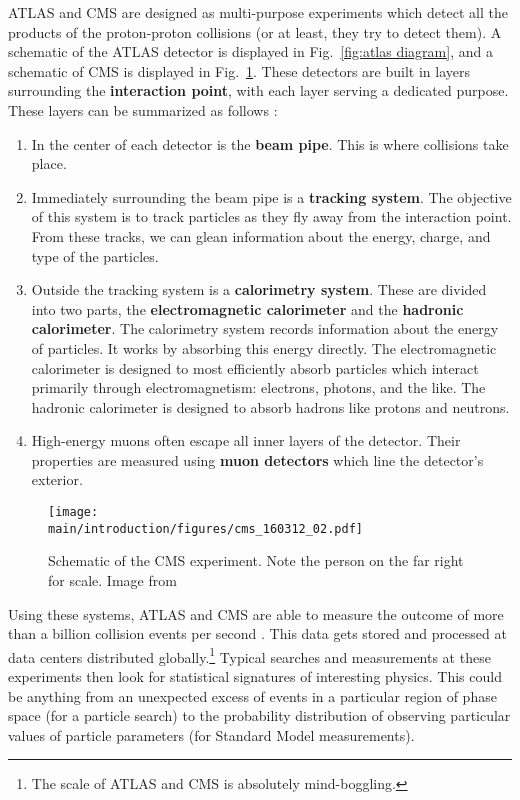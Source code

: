 \documentclass[12pt,twoside,class=../reedthesis, crop=false]{standalone}
\begin{document}
	ATLAS and CMS are designed as multi-purpose experiments which detect all the products of the proton-proton collisions (or at least, they try to detect them). A schematic of the ATLAS detector is displayed in Fig.~\ref{fig:atlas diagram}, and a schematic of CMS is displayed in Fig.~\ref{fig:cms diagram}. These detectors are built in layers surrounding the \textbf{interaction point}, with each layer serving a dedicated purpose. These layers can be summarized as follows \cite{larkoski_elementary_2019-1}:
	\begin{enumerate}
		\item In the center of each detector is the \textbf{beam pipe}. This is where collisions take place.

		\item Immediately surrounding the beam pipe is a \textbf{tracking system}. The objective of this system is to track particles as they fly away from the interaction point. From these tracks, we can glean information about the energy, charge, and type of the particles.

		\item Outside the tracking system is a \textbf{calorimetry system}. These are divided into two parts, the \textbf{electromagnetic calorimeter} and the \textbf{hadronic calorimeter}. The calorimetry system records information about the energy of particles. It works by absorbing this energy directly. The electromagnetic calorimeter is designed to most efficiently absorb particles which interact primarily through electromagnetism: electrons, photons, and the like. The hadronic calorimeter is designed to absorb hadrons like protons and neutrons.

		\item High-energy muons often escape all inner layers of the detector. Their properties are measured using \textbf{muon detectors} which line the detector's exterior.
	\end{enumerate}

	\begin{figure}
	\begin{center}
		\texttt{[image: \\main/introduction/figures/cms\_160312\_02.pdf]}
		\caption{\label{fig:cms diagram}Schematic of the CMS experiment. Note the person on the far right for scale. Image from \cite{sakuma_detector_2014}}
	\end{center}
	\end{figure}

	Using these systems, ATLAS and CMS are able to measure the outcome of more than a billion collision events per second \cite{atlas_outreach_atlas_2012}. This data gets stored and processed at data centers distributed globally.\footnote{The scale of ATLAS and CMS is absolutely mind-boggling.} Typical searches and measurements at these experiments then look for statistical signatures of interesting physics. This could be anything from an unexpected excess of events in a particular region of phase space (for a particle search) to the probability distribution of observing particular values of particle parameters (for Standard Model measurements). 
\end{document}
